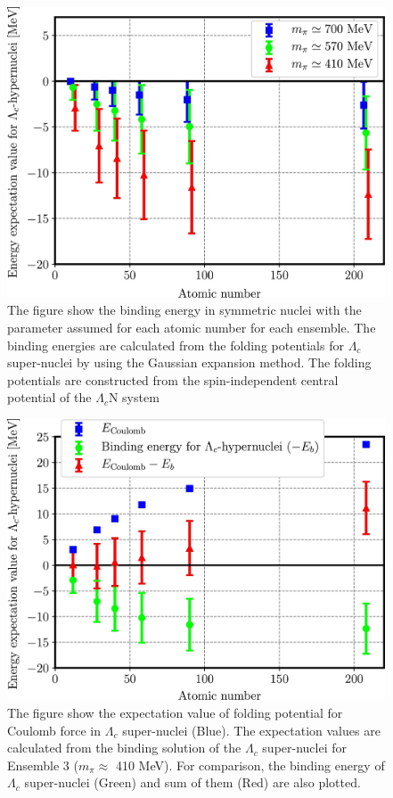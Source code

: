 \documentclass[12pt,a4paper]{book}
\begin{document}
	
	\begin{figure}
		\centering
		\includegraphics[width=0.7 \linewidth]{pictures/binding_energy.jpg}
		\caption{ The figure show the binding energy in symmetric nuclei with the parameter assumed for each atomic number for each ensemble. The binding energies are calculated from the folding potentials for $\Lambda_c$ super-nuclei by using the Gaussian expansion method. The folding potentials are constructed from the spin-independent central potential of the $\Lambda_c$N system}
		\label{fig:binding_energy}
	\end{figure}
	
	
	\begin{figure}
		\centering
		\includegraphics[width=0.7 \linewidth]{pictures/binding_culomb.jpg}
		\caption{The figure show the expectation value of folding potential for Coulomb force in $\Lambda_c$ super-nuclei (Blue). The expectation values are calculated from the binding solution of the $\Lambda_c$ super-nuclei for Ensemble 3 ($m_\pi \approx$ 410 MeV). For comparison, the binding energy of $\Lambda_c$ super-nuclei (Green) and sum of them (Red) are also plotted.}
		\label{fig:binding_culomb}
	\end{figure}
	
\end{document}

